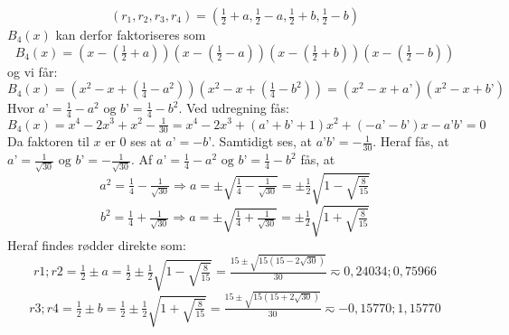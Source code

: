 \[(r_{1},r_{2},r_{3},r_{4})=\left(\tfrac{1}{2}+a,\tfrac{1}{2}-a,\tfrac{1}{2}+b,\tfrac{1}{2}-b\right)\]
\(B_{4}(x)\) kan derfor faktoriseres som 
\[B_{4}(x)=\left(x-(\tfrac{1}{2}+a)\right)\left(x-(\tfrac{1}{2}-a)\right)\left(x-(\tfrac{1}{2}+b)\right)\left(x-(\tfrac{1}{2}-b)\right)\] og vi får:
\[B_{4}(x)=\left(x^{2}-x+(\tfrac{1}{4}-a^{2})\right)\left(x^{2}-x+(\tfrac{1}{4}-b^{2})\right)=\left(x^{2}-x+a’\right)\left(x^{2}-x+b’\right)\]
Hvor \(a’=\tfrac{1}{4}-a^{2} \text{ og } b’=\tfrac{1}{4}-b^{2}\). Ved udregning fås:
\[B_{4}(x)=x^{4}-2x^{3}+x^{2}-\tfrac{1}{30}=x^{4}-2x^{3}+(a’+b’+1)x^{2}+(-a’-b’)x-a’b’=0\]
Da faktoren til \(x\) er \(0\) ses at \(a’=-b’\).  Samtidigt ses, at \(a’b’ = -\tfrac{1}{30}\). Heraf fås, at 
\(a’=\tfrac{1}{\sqrt{30}} \text{ og } b’=-\tfrac{1}{\sqrt{30}}\).
Af \(a’= \tfrac{1}{4}-a^{2} \text{ og } b’=\tfrac{1}{4}-b^{2}\) fås, at 
\[a^{2}=\tfrac{1}{4}-\tfrac{1}{\sqrt{30}} \Rightarrow a= \pm \sqrt{\tfrac{1}{4}-\tfrac{1}{\sqrt{30}}}=\pm\tfrac{1}{2}\sqrt{1-\sqrt{\tfrac{8}{15}}}\]
\[b^{2}=\tfrac{1}{4}+\tfrac{1}{\sqrt{30}} \Rightarrow a= \pm \sqrt{\tfrac{1}{4}+\tfrac{1}{\sqrt{30}}}=\pm\tfrac{1}{2}\sqrt{1+\sqrt{\tfrac{8}{15}}}\]
Heraf findes rødder direkte som:
\[r1;r2=\tfrac{1}{2}\pm a=\tfrac{1}{2}\pm\tfrac{1}{2}\sqrt{1-\sqrt{\tfrac{8}{15}}}=\tfrac{15 \pm \sqrt{15(15-2\sqrt{30})}}{30} \eqsim 0,24034; 0,75966\]
\[r3;r4=\tfrac{1}{2}\pm b=\tfrac{1}{2}\pm\tfrac{1}{2}\sqrt{1+\sqrt{\tfrac{8}{15}}}=\tfrac{15 \pm \sqrt{15(15+2\sqrt{30})}}{30}  \eqsim -0,15770; 1,15770\]

